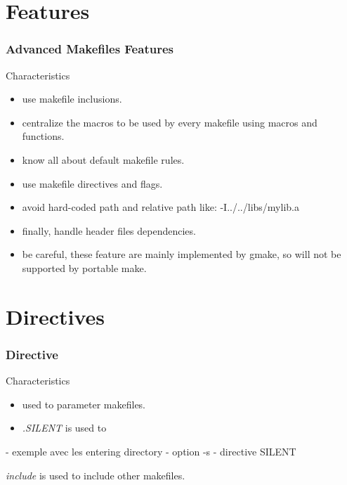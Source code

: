 \documentclass{beamer}
\begin{document}
%
%

\section{Features}


\begin{frame}
  \frametitle{Advanced Makefiles Features}

  \begin{block}{Characteristics}
    \begin{itemize}
      \item<1->
        use makefile inclusions.
      \item<1->
        centralize the macros to be used by every makefile using
        macros and functions.
      \item<1->
        know all about default makefile rules.
      \item<1->
        use makefile directives and flags.
      \item<1->
        avoid hard-coded path and relative path like: -I../../libs/mylib.a
      \item<1->
        finally, handle header files dependencies.
      \item<2->
        be careful, these feature are mainly implemented by \alert{gmake},
        so will not be supported by portable make.
    \end{itemize}
  \end{block}

\end{frame}

%
%

\section{Directives}


\begin{frame}
  \frametitle{Directive}

  \begin{block}{Characteristics}
    \begin{itemize}
      \item
        used to parameter makefiles.
      \item
        \textit{.SILENT} is used to
    \end{itemize}
  \end{block}

- exemple avec les entering directory
- option -s
- directive SILENT

        \textit{include} is used to include other makefiles.
      \item

\end{frame}
\end{document}

